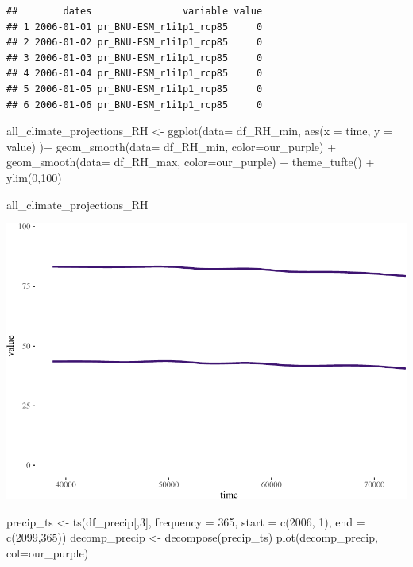 \documentclass[
  paper=a4,
  ,captions=tableheading
]{scrartcl}
\newenvironment{Shaded}{\begin{snugshade}}{\end{snugshade}}
\newcommand{\AttributeTok}[1]{\textcolor[rgb]{0.77,0.63,0.00}{#1}}
\newcommand{\DecValTok}[1]{\textcolor[rgb]{0.00,0.00,0.81}{#1}}
\newcommand{\FunctionTok}[1]{\textcolor[rgb]{0.00,0.00,0.00}{#1}}
\newcommand{\NormalTok}[1]{#1}
\newcommand{\OtherTok}[1]{\textcolor[rgb]{0.56,0.35,0.01}{#1}}
\newcommand{\SpecialCharTok}[1]{\textcolor[rgb]{0.00,0.00,0.00}{#1}}
\begin{document}
\begin{verbatim}
##        dates                variable value
## 1 2006-01-01 pr_BNU-ESM_r1i1p1_rcp85     0
## 2 2006-01-02 pr_BNU-ESM_r1i1p1_rcp85     0
## 3 2006-01-03 pr_BNU-ESM_r1i1p1_rcp85     0
## 4 2006-01-04 pr_BNU-ESM_r1i1p1_rcp85     0
## 5 2006-01-05 pr_BNU-ESM_r1i1p1_rcp85     0
## 6 2006-01-06 pr_BNU-ESM_r1i1p1_rcp85     0
\end{verbatim}

\begin{Shaded}
\begin{Highlighting}[]
\NormalTok{all\_climate\_projections\_RH }\OtherTok{\textless{}{-}} \FunctionTok{ggplot}\NormalTok{(}\AttributeTok{data=}\NormalTok{ df\_RH\_min, }\FunctionTok{aes}\NormalTok{(}\AttributeTok{x =}\NormalTok{ time, }\AttributeTok{y =}\NormalTok{ value) )}\SpecialCharTok{+} 
  \FunctionTok{geom\_smooth}\NormalTok{(}\AttributeTok{data=}\NormalTok{ df\_RH\_min, }\AttributeTok{color=}\NormalTok{our\_purple) }\SpecialCharTok{+}
  \FunctionTok{geom\_smooth}\NormalTok{(}\AttributeTok{data=}\NormalTok{ df\_RH\_max, }\AttributeTok{color=}\NormalTok{our\_purple) }\SpecialCharTok{+}
  \FunctionTok{theme\_tufte}\NormalTok{() }\SpecialCharTok{+}
  \FunctionTok{ylim}\NormalTok{(}\DecValTok{0}\NormalTok{,}\DecValTok{100}\NormalTok{)}
  

\NormalTok{all\_climate\_projections\_RH}
\end{Highlighting}
\end{Shaded}

\includegraphics{Haskell_files/figure-latex/unnamed-chunk-79-1.pdf}

\begin{Shaded}
\begin{Highlighting}[]
\NormalTok{precip\_ts }\OtherTok{\textless{}{-}} \FunctionTok{ts}\NormalTok{(df\_precip[,}\DecValTok{3}\NormalTok{], }\AttributeTok{frequency =} \DecValTok{365}\NormalTok{, }\AttributeTok{start =} \FunctionTok{c}\NormalTok{(}\DecValTok{2006}\NormalTok{, }\DecValTok{1}\NormalTok{), }\AttributeTok{end =} \FunctionTok{c}\NormalTok{(}\DecValTok{2099}\NormalTok{,}\DecValTok{365}\NormalTok{))}
\NormalTok{decomp\_precip }\OtherTok{\textless{}{-}} \FunctionTok{decompose}\NormalTok{(precip\_ts)}
\FunctionTok{plot}\NormalTok{(decomp\_precip, }\AttributeTok{col=}\NormalTok{our\_purple)}
\end{Highlighting}
\end{Shaded}
\end{document}

